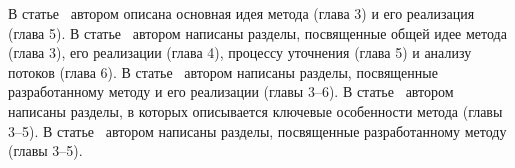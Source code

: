 В статье~\cite{lockatorVAK} автором описана основная идея метода (глава 3) и его реализация (глава 5).
В статье~\cite{lockatorVAK2} автором написаны разделы, посвященные общей идее метода (глава 3), его реализации (глава 4), процессу уточнения (глава 5) и анализу потоков (глава 6).
В статье~\cite{TMPA2017} автором написаны разделы, посвященные разработанному методу и его реализации (главы 3--6).
В статье~\cite{lockatorSyrcose} автором написаны разделы, в которых описывается ключевые особенности метода (главы 3--5).
В статье~\cite{lockatorTMPA} автором написаны разделы, посвященные разработанному методу (главы 3--5).

